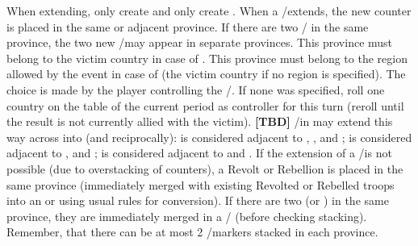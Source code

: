 \bparag When extending, \REVOLT only create \REVOLT and \REBELLION only create
\REBELLION.
\bparag When a \REVOLT/\REBELLION\Faceplus extends, the new counter is placed
in the same or adjacent province. If there are two \REVOLT/\REBELLION\Faceplus
in the same province, the two new \REVOLT/\REBELLION\Facemoins may appear in
separate provinces.
\bparag This province must belong to the victim country in case of \REVOLT.
\bparag This province must belong to the region allowed by the event in case
of \REBELLION (the victim country if no region is specified).
\bparag The choice is made by the player controlling the
\REVOLT/\REBELLION. If none was specified, roll one country on the \REVOLT
table of the current period as controller for this turn (reroll until the
result is not currently allied with the victim).
\bparag \textbf{[TBD]} \REVOLT/\REBELLION in \regionIrlande may extend this
way across \seazoneIrlande into \ANG (and reciprocally): \provinceUlster is
considered adjacent to \provinceAlba, \provinceAyr, \provinceGalloway and
\provinceCumberland ; \provinceBrega is considered adjacent to
\provinceCumberland, \provinceLancashire and \provinceCymru ;
\provinceLeinster is considered adjacent to \provinceCymru and
\provinceCornwall.
\bparag If the extension of a \REVOLT/\REBELLION\faceplus is not possible (due
to overstacking of counters), a Revolt or Rebellion \LD is placed in the same
province (immediately merged with existing Revolted or Rebelled troops into an
\ARMY\Facemoins or \ARMY\Faceplus using usual rules for conversion).
\bparag If there are two \REVOLT\Facemoins (or \REBELLION\Facemoins) in the
same province, they are immediately merged in a \REVOLT/\REBELLION\Faceplus
(before checking stacking).
\bparag Remember, that there can be at most 2 \REVOLT/\REBELLION markers
stacked in each province.

